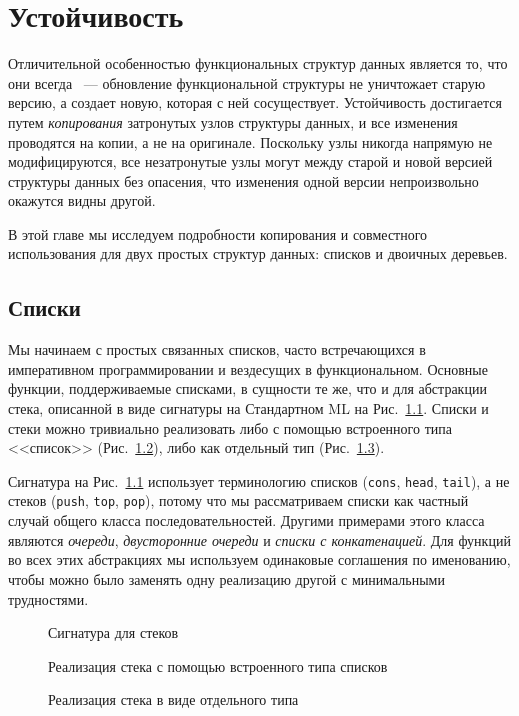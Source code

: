 \chapter{Устойчивость}
\label{ch:2}

Отличительной особенностью функциональных структур данных является то,
что они всегда ~--- обновление
функциональной структуры не уничтожает старую версию, а создает
новую, которая с ней сосуществует. Устойчивость достигается путем
\emph{копирования} затронутых узлов структуры данных, и все изменения
проводятся на копии, а не на оригинале. Поскольку узлы никогда
напрямую не модифицируются, все незатронутые узлы могут
 между старой и новой версией структуры
данных без опасения, что изменения одной версии непроизвольно окажутся
видны другой.

В этой главе мы исследуем подробности копирования и совместного использования для
двух простых структур данных: списков и двоичных деревьев.

\section{Списки}
\label{sc:2.1}

Мы начинаем с простых связанных списков, часто встречающихся в
императивном программировании и вездесущих в функциональном.  Основные
функции, поддерживаемые списками, в сущности те же, что и для
абстракции стека, описанной в виде сигнатуры на Стандартном ML на
Рис.~\ref{fig:2.1}.  Списки и стеки можно тривиально реализовать либо
с помощью встроенного типа <<список>> (Рис.~\ref{fig:2.2}), либо как
отдельный тип (Рис.~\ref{fig:2.3}).

\begin{remark}
Сигнатура на Рис.~\ref{fig:2.1} использует терминологию списков
(\texttt{cons}, \texttt{head}, \texttt{tail}), а не стеков
(\texttt{push}, \texttt{top}, \texttt{pop}), потому что мы
рассматриваем списки как частный случай общего класса
последовательностей. Другими примерами этого класса являются
\emph{очереди}, \emph{двусторонние очереди} и \emph{списки с
  конкатенацией}. Для функций во всех этих абстракциях мы используем
одинаковые соглашения по именованию, чтобы можно было заменять одну
реализацию другой с минимальными трудностями.
\end{remark}

\begin{figure}
  \centering

  \caption{Сигнатура для стеков}
  \label{fig:2.1}
\end{figure}
\begin{figure}
  \centering

  \caption{Реализация стека с помощью встроенного типа списков}
  \label{fig:2.2}
\end{figure}
\begin{figure}
  \centering

  \caption{Реализация стека в виде отдельного типа}
  \label{fig:2.3}
\end{figure}

